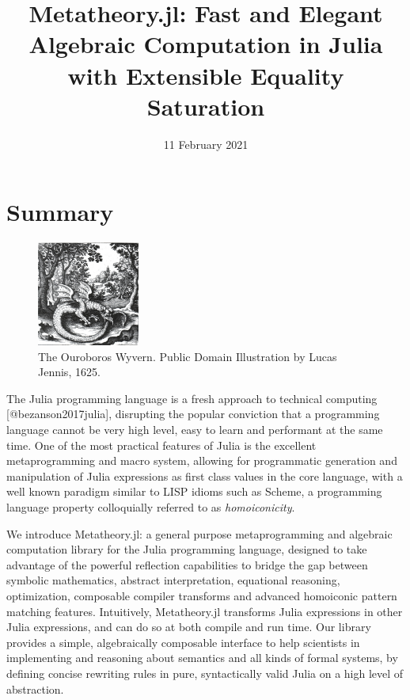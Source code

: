 \documentclass[
]{article}
\title{Metatheory.jl: Fast and Elegant Algebraic Computation in Julia
with Extensible Equality Saturation}
\author{}
\date{11 February 2021}
\begin{document}
\maketitle

\hypertarget{summary}{%
\section{Summary}\label{summary}}

\begin{figure}
\centering
\includegraphics[width=0.3\textwidth,height=\textheight]{dragon.jpg}
\caption{The Ouroboros Wyvern. Public Domain Illustration by Lucas
Jennis, 1625.\label{fig:dragon}}
\end{figure}

The Julia programming language is a fresh approach to technical
computing {[}@bezanson2017julia{]}, disrupting the popular conviction
that a programming language cannot be very high level, easy to learn and
performant at the same time. One of the most practical features of Julia
is the excellent metaprogramming and macro system, allowing for
programmatic generation and manipulation of Julia expressions as first
class values in the core language, with a well known paradigm similar to
LISP idioms such as Scheme, a programming language property colloquially
referred to as \emph{homoiconicity}.

We introduce Metatheory.jl: a general purpose metaprogramming and
algebraic computation library for the Julia programming language,
designed to take advantage of the powerful reflection capabilities to
bridge the gap between symbolic mathematics, abstract interpretation,
equational reasoning, optimization, composable compiler transforms and
advanced homoiconic pattern matching features. Intuitively,
Metatheory.jl transforms Julia expressions in other Julia expressions,
and can do so at both compile and run time. Our library provides a
simple, algebraically composable interface to help scientists in
implementing and reasoning about semantics and all kinds of formal
systems, by defining concise rewriting rules in pure, syntactically
valid Julia on a high level of abstraction.
\end{document}
